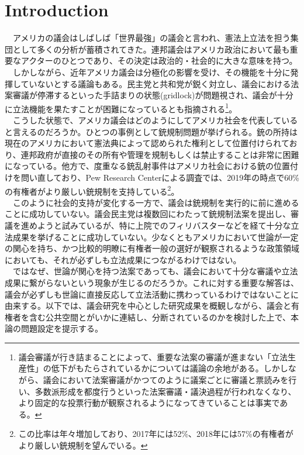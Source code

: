 \section{Introduction}
　アメリカの議会はしばしば「世界最強」の議会\citep*{2004-cr}と言われ、憲法上立法を担う集団として多くの分析が蓄積されてきた。連邦議会はアメリカ政治において最も重要なアクターのひとつであり、その決定は政治的・社会的に大きな意味を持つ。\\
　しかしながら、近年アメリカ議会は分極化の影響を受け、その機能を十分に発揮していないとする議論もある。民主党と共和党が鋭く対立し、議会における法案審議が停滞するといった手詰まりの状態(gridlock)が問題視され、議会が十分に立法機能を果たすことが困難になっているとも指摘される\footnote{議会審議が行き詰まることによって、重要な法案の審議が進まない「立法生産性」の低下がもたらされているかについては議論の余地がある。\citep*{}しかしながら、議会において法案審議がかつてのように議案ごとに審議と票読みを行い、多数派形成を都度行うといった法案審議・議決過程が行われなくなり、より固定的な投票行動が観察されるようになってきていることは事実である。\citep*{Poole2017-ir,Layman2006-tg}}。\\
　こうした状態で、アメリカ議会はどのようにしてアメリカ社会を代表していると言えるのだろうか。ひとつの事例として銃規制問題が挙げられる。銃の所持は現在のアメリカにおいて憲法典によって認められた権利として位置付けられており、連邦政府が直接のその所有や管理を規制もしくは禁止することは非常に困難になっている。他方で、度重なる銃乱射事件はアメリカ社会における銃の位置付けを問い直しており、Pew Research Centerによる調査では、2019年の時点で60\%の有権者がより厳しい銃規制を支持している\footnote{この比率は年々増加しており、2017年には52\%、2018年には57\%の有権者がより厳しい銃規制を望んでいる。}。\citep*{Schaeffer2019-ld}\\
　このように社会的支持が変化する一方で、議会は銃規制を実行的に前に進めることに成功していない。議会民主党は複数回にわたって銃規制法案を提出し、審議を進めようと試みているが、特に上院でのフィリバスターなどを経て十分な立法成果を挙げることに成功していない。少なくともアメリカにおいて世論が一定の関心を持ち、かつ比較的明瞭に有権者一般の選好が観察されるような政策領域においても、それが必ずしも立法成果につながるわけではない。\\
　ではなぜ、世論が関心を持つ法案であっても、議会において十分な審議や立法成果に繋がらないという現象が生じるのだろうか。これに対する重要な解答は、議会が必ずしも世論に直接反応して立法活動に携わっているわけではないことに由来する。以下では、議会研究を中心とした研究成果を概観しながら、議会と有権者を含む公共空間とがいかに連結し、分断されているのかを検討した上で、本論の問題設定を提示する。\\

